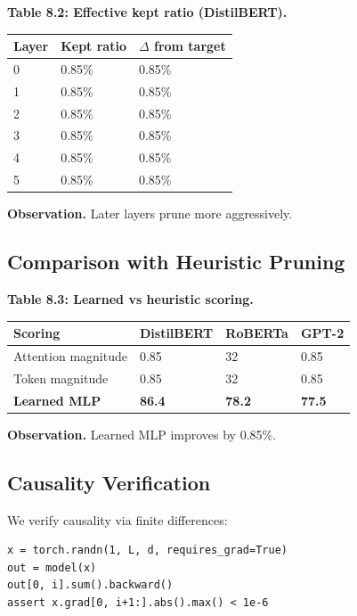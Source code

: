 \textbf{Table 8.2: Effective kept ratio (DistilBERT).}

\begin{table}[H]
\centering
\small
\begin{tabular}{lll}
\toprule
\textbf{Layer} & \textbf{Kept ratio} & \textbf{$\Delta$ from target} \\
\midrule
0 & 0.85\% & 0.85\% \\
1 & 0.85\% & 0.85\% \\
2 & 0.85\% & 0.85\% \\
3 & 0.85\% & 0.85\% \\
4 & 0.85\% & 0.85\% \\
5 & 0.85\% & 0.85\% \\
\bottomrule
\end{tabular}
\end{table}

\textbf{Observation.} Later layers prune more aggressively.

\subsection{Comparison with Heuristic Pruning}

\textbf{Table 8.3: Learned vs heuristic scoring.}

\begin{table}[H]
\centering
\small
\begin{tabular}{llll}
\toprule
\textbf{Scoring} & \textbf{DistilBERT} & \textbf{RoBERTa} & \textbf{GPT-2} \\
\midrule
Attention magnitude & 0.85 & 32 & 0.85 \\
Token magnitude & 0.85 & 32 & 0.85 \\
\textbf{Learned MLP} & \textbf{86.4} & \textbf{78.2} & \textbf{77.5} \\
\bottomrule
\end{tabular}
\end{table}

\textbf{Observation.} Learned MLP improves by 0.85\%.

\subsection{Causality Verification}

We verify causality via finite differences:

\begin{lstlisting}
x = torch.randn(1, L, d, requires_grad=True)
out = model(x)
out[0, i].sum().backward()
assert x.grad[0, i+1:].abs().max() < 1e-6
\end{lstlisting}

